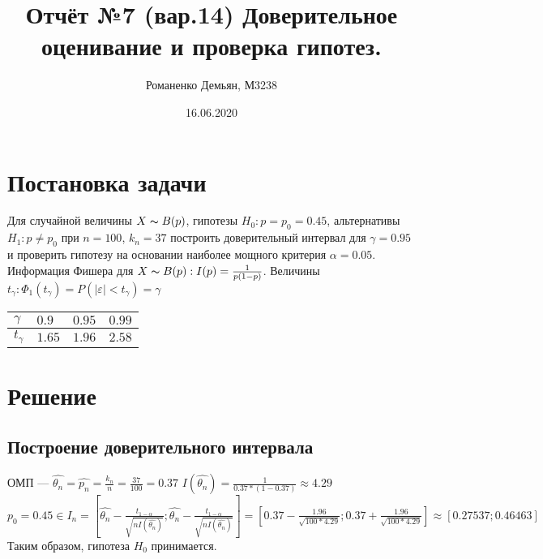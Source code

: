 \documentclass{article}
\title{\textbf{Отчёт №7 (вар.14)} Доверительное оценивание и проверка гипотез.}
\author{Романенко Демьян, М3238}
\date{16.06.2020}
\begin{document}
	\maketitle
	\newpage

\maketitle
    \section{Постановка задачи}
        Для случайной величины $X \thicksim B(p)$, гипотезы $H_0 : p = p_0 = 0.45$, альтернативы $H_1 : p \neq p_0$ при $n = 100$, $k_n = 37$ построить доверительный интервал для $\gamma = 0.95$ и проверить гипотезу на основании наиболее мощного критерия $\alpha = 0.05$.
        \newline
        Информация Фишера для $X \thicksim B(p) : I(p) = \frac{1}{p(1-p)}$. 
        \newline
        Величины $t_{\gamma}: \Phi_1(t_{\gamma}) = P(|\varepsilon| < t_{\gamma}) = \gamma$
        \newline
        \begin{tabular}{ | l || l | l | l | }
        \hline
        $\gamma$ & $0.9$ & $0.95$ & $0.99$  \\ \hline
        $t_{\gamma}$ & $1.65$ & $1.96$ & $2.58$ \\ 
        \hline
        \end{tabular}
    \section{Решение}
        \subsection{Построение доверительного интервала}
            ОМП {---} $\hat{\theta_n} = \hat{p_n} = \frac{k_n}{n} = \frac{37}{100} = 0.37$
            \newline
            $I(\hat{\theta_n}) = \frac{1}{0.37 * (1 - 0.37)} \approx 4.29$
            \newline
            $p_0 = 0.45 \in I_n = \left[ \hat{\theta_n} - \frac{t_{1 - \alpha}}{\sqrt{n I(\hat{\theta_n})}}; \hat{\theta_n} - \frac{t_{1 - \alpha}}{\sqrt{n I(\hat{\theta_n})}} \right] = \left[ 0.37 - \frac{1.96}{\sqrt{100 * 4.29}}; 0.37 + \frac{1.96}{\sqrt{100 * 4.29}} \right] \approx \left[ 0.27537; 0.46463 \right]$
            \newline
            Таким образом, гипотеза $H_0$ принимается.
\end{document}
